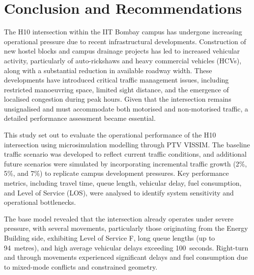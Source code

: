 \documentclass[11pt]{article}
\begin{document}
\section{Conclusion and Recommendations}
The H10 intersection within the IIT Bombay campus has undergone increasing operational pressure due to
recent infrastructural developments. Construction of new hostel blocks and campus drainage projects has
led to increased vehicular activity, particularly of auto-rickshaws and heavy commercial vehicles
(HCVs), along with a substantial reduction in available roadway width. These developments have
introduced critical traffic management issues, including restricted manoeuvring space, limited sight
distance, and the emergence of localised congestion during peak hours. Given that the intersection
remains unsignalised and must accommodate both motorised and non-motorised traffic, a detailed
performance assessment became essential.

This study set out to evaluate the operational performance of the H10 intersection using microsimulation
modelling through PTV VISSIM. The baseline traffic scenario was developed to reflect current traffic
conditions, and additional future scenarios were simulated by incorporating incremental traffic growth
(2\%, 5\%, and 7\%) to replicate campus development pressures. Key performance metrics, including travel
time, queue length, vehicular delay, fuel consumption, and Level of Service (LOS), were analysed to
identify system sensitivity and operational bottlenecks.

The base model revealed that the intersection already operates under severe pressure, with several
movements, particularly those originating from the Energy Building side, exhibiting Level of Service F,
long queue lengths (up to 94~metres), and high average vehicular delays exceeding 100~seconds.
Right-turn and through movements experienced significant delays and fuel consumption due to mixed-mode
conflicts and constrained geometry.
\end{document}
